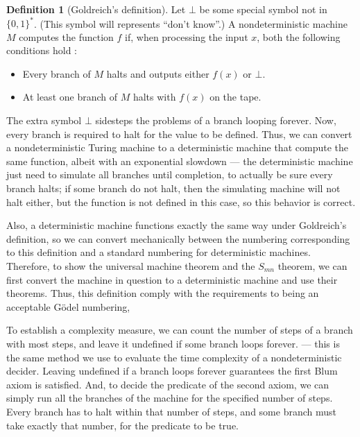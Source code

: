 \documentclass[12pt]{article}
\theoremstyle{definition}
\newtheorem{definition}{Definition}
\begin{document}
\begin{definition}[Goldreich's definition]
    Let $\bot$ be some special symbol not in $\{0, 1\}^*$.
    (This symbol will represents ``don't know''.)
    A nondeterministic machine $M$ computes the function $f$ if,
    when processing the input $x$,
    both the following conditions hold \cite[p.~168]{Goldreich2008}:
    \begin{itemize}
        \item Every branch of $M$ halts
            and outputs either $f(x)$ or $\bot$.
        \item At least one branch of $M$ halts with $f(x)$ on the tape.
    \end{itemize}
\end{definition}

The extra symbol $\bot$ sidesteps the problems of a branch looping forever.
Now,
every branch is required to halt for the value to be defined.
Thus,
we can convert a nondeterministic Turing machine to a deterministic machine
that compute the same function,
albeit with an exponential slowdown
--- the deterministic machine just need to simulate all branches until completion,
to actually be sure every branch halts;
if some branch do not halt,
then the simulating machine will not halt either,
but the function is not defined in this case,
so this behavior is correct.

Also, a deterministic machine functions exactly the same way under Goldreich's definition,
so we can convert mechanically
between the numbering corresponding to this definition
and a standard numbering for deterministic machines.
Therefore,
to show the universal machine theorem and the $S_{mn}$ theorem,
we can first convert the machine in question to a deterministic machine
and use their theorems.
Thus, this definition comply with the requirements to being an acceptable Gödel numbering,

To establish a complexity measure,
we can count the number of steps of a branch with most steps,
and leave it undefined if some branch loops forever.
--- this is the same method
we use to evaluate the time complexity of a nondeterministic decider.
Leaving undefined if a branch loops forever guarantees the first Blum axiom is satisfied.
And, to decide the predicate of the second axiom,
we can simply run all the branches of the machine for the specified number of steps.
Every branch has to halt within that number of steps,
and some branch must take exactly that number,
for the predicate to be true.
\end{document}
